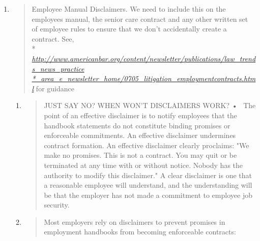 \documentclass[]{article}
\begin{document}
\begin{enumerate}
  \begin{enumerate}
  \def\labelenumii{\Alph{enumii}.}
  \item
    \begin{quote}
    Employee Manual Disclaimers. We need to include this on the
    employees manual, the senior care contract and any other written set
    of employee rules to ensure that we don't accidentally create a
    contract. See, \\*
    \href{http://www.americanbar.org/content/newsletter/publications/law_trends_news_practice_area_e_newsletter_home/0705_litigation_employmentcontracts.html}{\emph{http://www.americanbar.org/content/newsletter/publications/law\_trends\_news\_practice\\*\_area\_e\_newsletter\_home/0705\_litigation\_employmentcontracts.html}}
    for guidance
    \end{quote}

    \begin{enumerate}
    \def\labelenumiii{\arabic{enumiii}.}
    \item
      \begin{quote}
      JUST SAY NO? WHEN WON'T DISCLAIMERS WORK? •~ The point of an
      effective disclaimer is to notify employees that the handbook
      statements do not constitute binding promises or enforceable
      commitments. An effective disclaimer undermines contract
      formation. An effective disclaimer clearly proclaims: "We make no
      promises. This is not a contract. You may quit or be terminated at
      any time with or without notice. Nobody has the authority to
      modify this disclaimer." A clear disclaimer is one that a
      reasonable employee will understand, and the understanding will be
      that the employer has not made a commitment to employee job
      security.
      \end{quote}
    \item
      \begin{quote}
      Most employers rely on disclaimers to prevent promises in
      employment handbooks from becoming enforceable contracts:
      \end{quote}


\end{enumerate}
\end{enumerate}
\end{enumerate}
\end{document}
